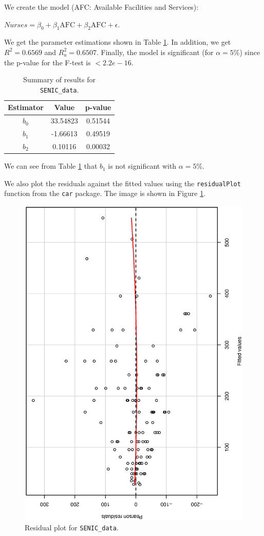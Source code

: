 \documentclass[]{article}
\begin{document}
We create the model (AFC: Available Facilities and Services):

$Nurses = \beta_0 + \beta_1 \text{AFC} + \beta_2 \text{AFC} + \epsilon$.

We get the parameter estimations shown in Table \ref{q6_1}. In addition, we get $R^2 = 0.6569$ and $R^2_a = 0.6507$. Finally, the model is significant (for $\alpha = 5\%$) since the p-value for the F-test is $< 2.2e-16$.

\begin{table}[!ht]
\caption{Summary of results for \texttt{SENIC\_data}.}
\begin{center}
\begin{tabular}{|c|c|c|}
\hline
Estimator & Value & p-value \\
\hline
$b_0$ & 33.54823 & 0.51544 \\
$b_1$ & -1.66613 & 0.49519 \\
$b_2$ & 0.10116 & 0.00032 \\
\hline
\end{tabular}
\end{center}
\label{q6_1}
\end{table}

We can see from Table \ref{q6_1} that $b_1$ is not significant with $\alpha = 5\%$.

We also plot the residuals against the fitted values using the \texttt{residualPlot} function from the \texttt{car} package. The image is shown in Figure \ref{fig6_1}.

\begin{figure}[!ht]
\centering
\includegraphics[width=.8\linewidth, angle=-90]{q6_1.eps}
\caption{Residual plot for \texttt{SENIC\_data}.}
\label{fig6_1}
\end{figure}
\end{document}
